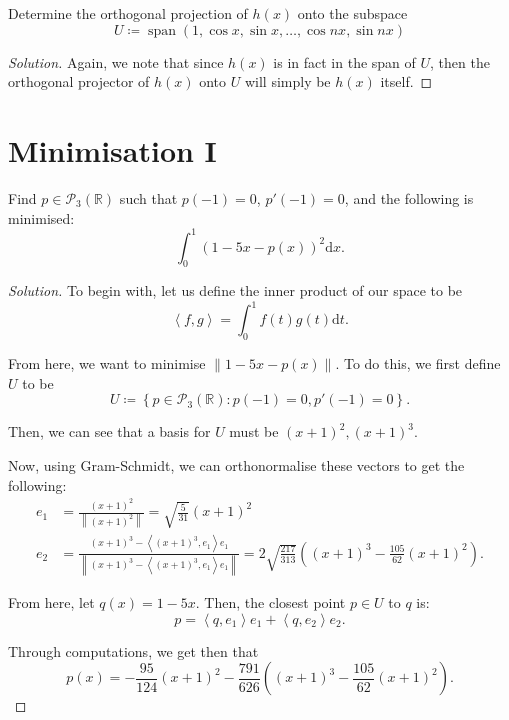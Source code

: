 \documentclass{article}
\newenvironment{solution}{\begin{proof}[Solution]}{\end{proof}}
\newcommand{\norm}[1]{\left\lVert{#1}\right\rVert}
\newcommand{\RR}{\mathbb{R}}
\DeclareMathOperator*{\vspan}{\mathrm{span}}
\newcommand{\innerproduct}[2]{\left\langle{#1}, {#2}\right\rangle}
\begin{document}
	\begin{hw}
		Determine the orthogonal projection of $h(x)$ onto the subspace
		\begin{equation*}
			U \coloneq \vspan(1, \cos x, \sin x, \ldots, \cos nx, \sin nx) \tag{for $n > 2$.}
		\end{equation*}
	\end{hw}
	\begin{solution}
		Again, we note that since $h(x)$ is in fact in the span of $U$, then the orthogonal projector of $h(x)$ onto $U$ will simply be $h(x)$ itself.
	\end{solution}
	
	\newpage
	
	\section{Minimisation I}
	\begin{hw}
		Find $p \in \mathscr{P}_{3}(\RR)$ such that $p(-1) = 0$, $p'(-1) = 0$, and the following is minimised:
		\begin{equation*}
			\int_{0}^{1} (1-5x-p(x))^{2} \mathrm dx.
		\end{equation*}
	\end{hw}
	\begin{solution}
		To begin with, let us define the inner product of our space to be
		\begin{equation*}
			\innerproduct{f}{g} = \int_{0}^{1} f(t)g(t) \mathrm dt.
		\end{equation*}
		
		From here, we want to minimise $\norm{1-5x-p(x)}$. To do this, we first define $U$ to be
		\begin{equation*}
			U \coloneq \left\{  p \in \mathscr{P}_{3}(\RR) : p(-1) = 0, p'(-1) = 0 \right\}.
		\end{equation*}
		
		Then, we can see that a basis for $U$ must be $(x+1)^{2}, (x+1)^{3}$.
		
		Now, using Gram-Schmidt, we can orthonormalise these vectors to get the following:
		\begin{align*}
			e_{1} &= \frac{(x+1)^{2}}{\norm{(x+1)^{2}}} = \sqrt{\frac{5}{31}}(x + 1)^{2} \\
			e_{2} &= \frac{(x+1)^{3} - \innerproduct{(x+1)^{3}}{e_{1}}e_{1}}{\norm{(x+1)^{3} - \innerproduct{(x+1)^{3}}{e_{1}}e_{1}}} = 2\sqrt{\frac{217}{313}}\left( (x+1)^{3} - \frac{105}{62}(x+1)^{2} \right).
		\end{align*}
		
		From here, let $q(x) = 1 - 5x$. Then, the closest point $p \in U$ to $q$ is:
		\begin{equation*}
			p = \innerproduct{q}{e_{1}}e_{1} + \innerproduct{q}{e_{2}}e_{2}.
		\end{equation*}
		
		Through computations, we get then that
		\begin{equation*}
			p(x) = - \frac{95}{124}(x+1)^{2} - \frac{791}{626}\left( (x+1)^{3} - \frac{105}{62}(x+1)^{2} \right).
		\end{equation*}
	\end{solution}
	
\end{document}
